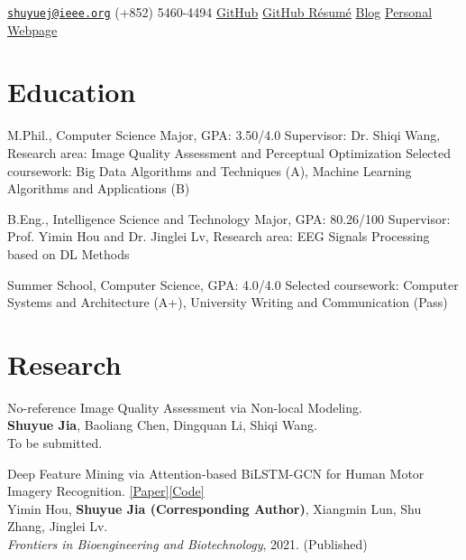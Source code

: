 \documentclass{my_cv}
\begin{document}
\hspace*{\fill}


\hspace*{\fill}

\longcontact
{\href{mailto:shuyuej@ieee.org}{\nolinkurl{shuyuej@ieee.org}}}
{(+852) 5460-4494}
{\href{https://github.com/SuperBruceJia}{GitHub}}
{\href{https://resume.github.io/?SuperBruceJia}{GitHub Résumé}}
{\href{http://shuyuej.com/blog}{Blog}}
{\href{https://shuyuej.com/}{Personal Webpage}}

\hspace*{\fill} 

\section{Education}
\workitemsthree
{M.Phil., Computer Science Major, GPA: 3.50/4.0}
{Supervisor: Dr. Shiqi Wang, Research area: Image Quality Assessment and Perceptual Optimization}
{Selected coursework: Big Data Algorithms and Techniques (A), Machine Learning Algorithms and Applications (B)}

\workitemstwo
{B.Eng., Intelligence Science and Technology Major, GPA: 80.26/100}
{Supervisor: Prof. Yimin Hou and Dr. Jinglei Lv, Research area: EEG Signals Processing based on DL Methods}

\workitemstwo
{Summer School, Computer Science, GPA: 4.0/4.0}
{Selected coursework: Computer Systems and Architecture (A+), University Writing and Communication (Pass)}

\hspace*{\fill}

\section{Research}

\workitemsone
{No-reference Image Quality Assessment via Non-local Modeling. \\
	\textbf{Shuyue Jia}, Baoliang Chen, Dingquan Li, Shiqi Wang. \\
	To be submitted.
}

\hspace*{\fill}

\workitemsone
{Deep Feature Mining via Attention-based BiLSTM-GCN for Human Motor Imagery Recognition. \href{https://www.frontiersin.org/articles/10.3389/fbioe.2021.706229/abstract}{[Paper]}\href{https://github.com/SuperBruceJia/EEG-DL}{[Code]}\\
	Yimin Hou, \textbf{Shuyue Jia (Corresponding Author)}, Xiangmin Lun, Shu Zhang, Jinglei Lv. \\
	\emph{Frontiers in Bioengineering and Biotechnology}, 2021. (Published)
}
\end{document}
